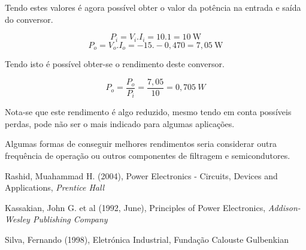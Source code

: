 \documentclass[a4paper,11pt]{article}
\numberwithin{equation}{section}
\begin{document}
Tendo estes valores é agora possível obter o valor da potência na entrada e saída do conversor.

\begin{equation}
P_i = V_i . I_i = 10 . 1 = 10  ~ \text{W}
\end{equation}
\vspace{-0,8 cm}
\begin{equation}
P_o = V_o . I_o = -15 . -0,470 = 7,05  ~ \text{W}
\end{equation}

Tendo isto é possível obter-se o rendimento deste conversor.

\begin{equation}
P_o = \frac{P_o}{P_i} = \frac{7,05}{10} = 0,705 ~ W
\end{equation}

Nota-se que este rendimento é algo reduzido, mesmo tendo em conta possíveis perdas, pode não ser o mais indicado para algumas aplicações.

Algumas formas de conseguir melhores rendimentos seria considerar outra frequência de operação ou outros componentes de filtragem e semicondutores.

\pagebreak

\begin{thebibliography}{2}
	
	Rashid, Muahammad H. (2004), Power Electronics - Circuits, Devices and Applications, \textit{Prentice Hall}	
	
	Kassakian, John G. et al (1992, June), Principles of Power Electronics, \textit{Addison-Wesley Publishing Company}
	
	Silva, Fernando (1998), Eletrónica Industrial, Fundação Calouste Gulbenkian
	
\end{thebibliography}


\pagebreak
\end{document}
